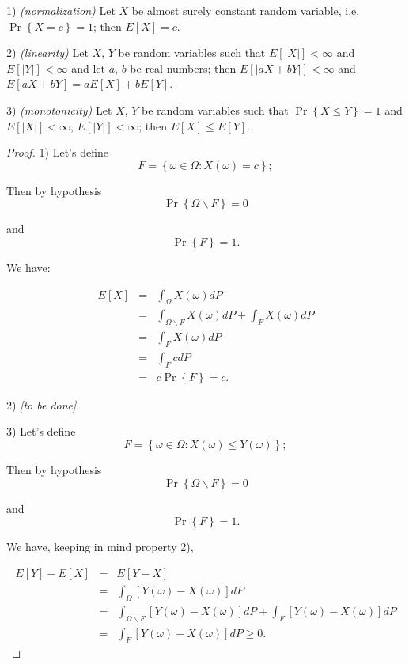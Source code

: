 \documentclass[12pt]{article}
\begin{document}
1) \emph{(normalization) } Let $X$ be almost surely constant random
variable, i.e. $\Pr \left\{ X=c\right\} =1$; then $E\left[ X\right] =c$.

2) \emph{(linearity) } Let $X$, $Y$ be random variables such that $E\left[
\left\vert X\right\vert \right] <\infty $ and $E\left[ \left\vert
Y\right\vert \right] <\infty $ and let $a$, $b$ be real numbers; then $E%
\left[ \left\vert aX+bY\right\vert \right] <\infty $ and $E\left[ aX+bY%
\right] =aE\left[ X\right] +bE\left[ Y\right] $.

3) \emph{(monotonicity) } Let $X$, $Y$ be random variables such that 
$\Pr \left\{ X\leq Y\right\} =1$ and $E\left[ \left\vert X\right\vert \right]
<\infty $, $E\left[ \left\vert Y\right\vert \right] <\infty $; then $E\left[
X\right] \leq E\left[ Y\right] $.

\begin{proof}

1) Let's define%
\[
F=\left\{ \omega \in \Omega :X\left( \omega \right) =c\right\} ;
\]

Then by hypothesis 
\[
\Pr \left\{ \Omega \backslash F\right\} =0
\]

and
\[
\Pr \left\{ F\right\} =1.
\]

We have:

\begin{eqnarray*}
E[X] &=&\int_{\Omega }X\left( \omega \right) dP \\
&=&\int_{\Omega \backslash F}X\left( \omega \right) dP+\int_{F}X\left(
\omega \right) dP \\
&=&\int_{F}X\left( \omega \right) dP \\
&=&\int_{F}cdP \\
&=&c\Pr \left\{ F\right\} =c.
\end{eqnarray*}


2) \textit{[to be done]}.


3) Let's define%
\[
F=\left\{ \omega \in \Omega :X\left( \omega \right) \leq Y\left( \omega
\right) \right\} ;
\]

Then by hypothesis 
\[
\Pr \left\{ \Omega \backslash F\right\} =0
\]

and
\[
\Pr \left\{ F\right\} =1.
\]

We have, keeping in mind property 2),

\begin{eqnarray*}
E[Y]-E[X] &=&E[Y-X] \\
&=&\int_{\Omega }\left[ Y\left( \omega \right) -X\left( \omega \right) %
\right] dP \\
&=&\int_{\Omega \backslash F}\left[ Y\left( \omega \right) -X\left( \omega
\right) \right] dP+\int_{F}\left[ Y\left( \omega \right) -X\left( \omega
\right) \right] dP \\
&=&\int_{F}\left[ Y\left( \omega \right) -X\left( \omega \right) \right]
dP\geq 0.
\end{eqnarray*}
\end{proof}
\end{document}
